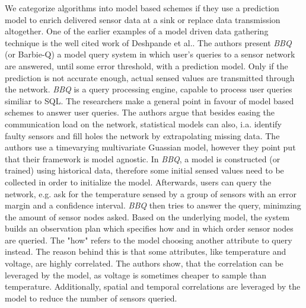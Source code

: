 We categorize algorithms into model based schemes if they use a prediction
model to enrich delivered sensor data at a sink or replace data transmission
altogether. One of the earlier examples of a model driven data gathering
technique is the well cited work of Deshpande et al.\cite{deshpande2004model}.
The authors present \textit{BBQ} (or Barbie-Q) a model query system in which
user's queries to a sensor network are answered, until some error threshold,
with a prediction model. Only if the prediction is not accurate enough, actual
sensed values are transmitted through the network. \textit{BBQ} is a query
processing engine, capable to process user queries similiar to \ac{SQL}. The
researchers make a general point in favour of model based schemes to answer
user queries. The authors argue that besides easing the communication load on
the network, statistical models can also, i.a. identify faulty sensors and fill
holes the network by extrapolating missing data. The authors use a timevarying
multivariate Guassian model, however they point put that their framework is
model agnostic. In \textit{BBQ}, a model is constructed (or trained) using
historical data, therefore some initial sensed values need to be collected in
order to initialize the model. Afterwards, users can query the network, e.g.
ask for the temperature sensed by a group of sensors with an error margin and a
confidence interval. \textit{BBQ} then tries to answer the query, minimzing the
amount of sensor nodes asked. Based on the underlying model, the system builds
an observation plan which specifies how and in which order sensor nodes are
queried. The "how" refers to the model choosing another attribute to query
instead. The reason behind this is that some attributes, like temperature and
voltage, are highly correlated. The authors show, that the correlation can be
leveraged by the model, as voltage is sometimes cheaper to sample than
temperature. Additionally, spatial and temporal correlations are leveraged by
the model to reduce the number of sensors queried.

